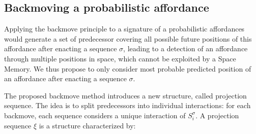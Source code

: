 \documentclass[conference]{IEEEtran}
\begin{document}


\subsection{Backmoving a probabilistic affordance}\label{backmove}

Applying the backmove principle to a signature of a probabilistic affordances would generate a set of predecessor covering all possible future positions of this affordance after enacting a sequence $\sigma$, leading to a detection of an affordance through multiple positions in space, which
cannot be exploited by a Space Memory.
We thus propose to only consider most probable predicted position of an affordance after enacting a sequence $\sigma$.

The proposed backmove method introduces a new structure, called projection sequence. The idea is to split predecessors into individual interactions: for each backmove, each sequence considers a unique interaction of $S_i^{\sigma}$.
A projection sequence $\xi$ is a structure characterized by:
\end{document}
